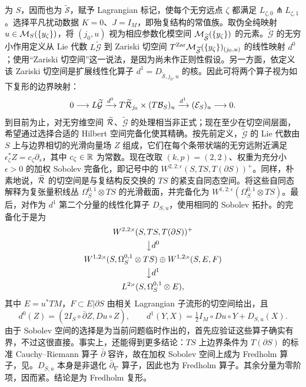 为 $S$，因而也为 $\widetilde{\mathcal S}$，赋予 Lagrangian 标记，使每个无穷远点 $\zeta$ 都满足 $L_{\zeta,\allowbreak 0}\pitchfork L_{\zeta,\allowbreak 1}$。选择平凡扰动数据 $K=0$、$J=I_M$，即殆复结构的常值族。取伪全纯映射 $u\in\mathcal M_S(\{y_\zeta\})$，将 $(j_0,\allowbreak u)$ 视为相应参数化模空间 $\mathcal M_{\widetilde{\mathcal S}}(\{y_\zeta\})$ 的元素。$\widetilde{\mathcal G}$ 的无穷小作用定义从 Lie 代数 $L\widetilde{\mathcal G}$ 到 Zariski 切空间 $T^{\mathrm{Zar}}\mathcal M_{\widetilde{\mathcal S}}(\{y_\zeta\})_{(j_0,\allowbreak u)}$ 的线性映射 $d^0$；使用“Zariski 切空间”这一说法，是因为尚未作正则性假设。另一方面，依定义该 Zariski 切空间是扩展线性化算子 $d^1=D_{\widetilde{\mathcal S},\allowbreak j_0,\allowbreak u}$ 的核。因此可将两个算子视为如下复形的边界映射：
\begin{equation}\label{eq:13.1}
0\longrightarrow L\widetilde{\mathcal G}\xrightarrow{d^0}T\widetilde{\mathcal R}_{j_0}\times(T\mathcal B_S)_u
\xrightarrow{d^1}(\mathcal E_S)_u\longrightarrow0.
\end{equation}
到目前为止，对无穷维空间 $\widetilde{\mathcal R}$、$\widetilde{\mathcal G}$ 的处理相当非正式；现在至少在切空间层面，希望通过选择合适的 Hilbert 空间完备化使其精确。按先前定义，$\widetilde{\mathcal G}$ 的 Lie 代数由 $S$ 上与边界相切的光滑向量场 $Z$ 组成，它们在每个条带状端的无穷远附近满足 $\epsilon_\zeta^*Z=c_\zeta\partial_s$，其中 $c_\zeta\in\mathbb R$ 为常数。现在改取 $(k,\allowbreak p)=(2,\allowbreak 2)$、权重为充分小 $\epsilon>0$ 的加权 Sobolev 完备化，即记号中的 $W^{2,\allowbreak 2;\epsilon}(S,\allowbreak TS,\allowbreak T(\partial S))^+$。同样，朴素地说，$\widetilde{\mathcal R}$ 的切空间是与复结构反交换的 $TS$ 的紧支自同态空间。将这些自同态解释为复张量积线丛 $\Omega_S^{0,\allowbreak 1}\otimes TS$ 的光滑截面，并完备化为
$W^{1,\allowbreak 2;\epsilon}(\Omega_S^{0,\allowbreak 1}\otimes TS)$。最后，对作为 $d^1$ 第二个分量的线性化算子 $D_{S,\allowbreak u}$，使用相同的 Sobolev 拓扑。的完备化于是为
\begin{equation}\label{eq:13.2}
\begin{gathered}
W^{2,2;\epsilon}(S,TS,T(\partial S))^+\\
\big\downarrow d^0\\
W^{1,2;\epsilon}(S,\Omega_S^{0,1}\otimes TS)\oplus W^{1,2;\epsilon}(S,E,F)\\
\big\downarrow d^1\\
L^{2;\epsilon}(S,\Omega_S^{0,1}\otimes E),
\end{gathered}
\end{equation}
其中 $E=u^*TM$，$F\subset E|\partial S$ 由相关 Lagrangian 子流形的切空间给出，且
\[
d^0(Z)=(2I_S\circ\bar\partial Z,Du\circ Z),\qquad
d^1(Y,X)=\tfrac12I_M\circ Du\circ Y+D_{S,u}(X).
\]
由于 Sobolev 空间的选择是为当前问题临时作出的，首先应验证这些算子确实有界，不过这很直接。事实上，还能得到更多结论：$TS$ 上边界条件为 $T(\partial S)$ 的标准 Cauchy–Riemann 算子 $\bar\partial$ 容许，故在加权 Sobolev 空间上成为 Fredholm 算子，见。$D_{S,\allowbreak u}$ 本身是非退化 $\bar\partial_\nabla$ 算子，因此也为 Fredholm 算子。其余分量为零阶项，因而紧。结论是为 Fredholm 复形。


